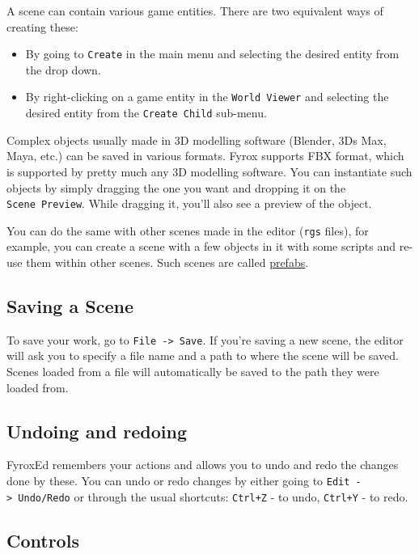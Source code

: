 \documentclass[
]{book}
\providecommand{\tightlist}{%
  \setlength{\itemsep}{0pt}\setlength{\parskip}{0pt}}
\theoremstyle{definition}
\theoremstyle{definition}
\theoremstyle{definition}
\theoremstyle{definition}
\theoremstyle{remark}
\begin{document}
A scene can contain various game entities. There are two equivalent ways of creating these:

\begin{itemize}
\tightlist
\item
  By going to \texttt{Create} in the main menu and selecting the desired entity from the drop down.
\item
  By right-clicking on a game entity in the \texttt{World\ Viewer} and selecting the desired entity from the \texttt{Create\ Child} sub-menu.
\end{itemize}

Complex objects usually made in 3D modelling software (Blender, 3Ds Max, Maya, etc.) can be saved in various formats. Fyrox supports FBX format, which is supported by pretty much any 3D modelling software. You can instantiate such objects by simply dragging the one you want and dropping it on the \texttt{Scene\ Preview}. While dragging it, you'll also see a preview of the object.

You can do the same with other scenes made in the editor (\texttt{rgs} files), for example, you can create a scene with a few objects in it with some scripts and re-use them within other scenes. Such scenes are called \href{../scene/prefab.md}{prefabs}.

\subsection{Saving a Scene}\label{saving-a-scene}

To save your work, go to \texttt{File\ -\textgreater{}\ Save}. If you're saving a new scene, the editor will ask you to specify a file name and a path to where the scene will be saved. Scenes loaded from a file will automatically be saved to the path they were loaded from.

\subsection{Undoing and redoing}\label{undoing-and-redoing}

FyroxEd remembers your actions and allows you to undo and redo the changes done by these. You can undo or redo changes by either going to \texttt{Edit\ -\textgreater{}\ Undo/Redo} or through the usual shortcuts: \texttt{Ctrl+Z} - to undo, \texttt{Ctrl+Y} - to redo.

\subsection{Controls}\label{controls}
\end{document}
